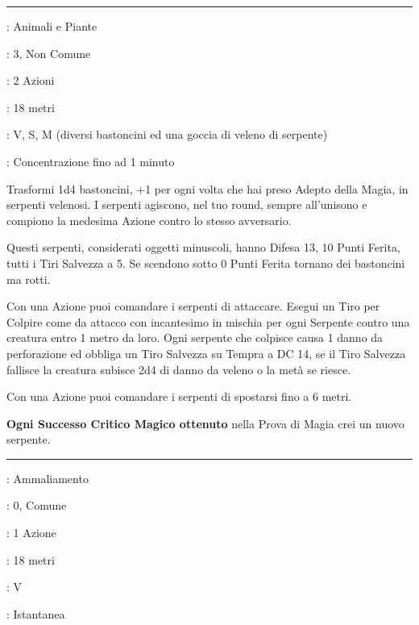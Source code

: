 \begin{multicols}{2}
\smallskip\noindent\rule{\linewidth}{2pt} \hypertarget{Bastoni in Serpenti}{}\medskip{}
\noindent
\begin{description}[noitemsep, topsep=0pt, parsep=0pt, partopsep=0pt, leftmargin=0cm, labelwidth=2.8cm]
	\item[\textbf{Lista di Magia}]: Animali e Piante
	\item[\textbf{Livello}]: 3, Non Comune
	\item[\textbf{T. di Lancio}]: 2 Azioni
	\item[\textbf{Gittata}]: 18 metri
	\item[\textbf{Componenti}]: V, S, M (diversi bastoncini ed una goccia di veleno di serpente)
	\item[\textbf{Durata}]: Concentrazione fino ad 1 minuto
\end{description}

Trasformi 1d4 bastoncini, +1 per ogni volta che hai preso Adepto della Magia, in serpenti velenosi. I serpenti agiscono, nel tuo round, sempre all'unisono e compiono la medesima Azione contro lo stesso avversario.

Questi serpenti, considerati oggetti minuscoli, hanno Difesa 13, 10 Punti Ferita, tutti i Tiri Salvezza a 5. Se scendono sotto 0 Punti Ferita tornano dei bastoncini ma rotti.

Con una Azione puoi comandare i serpenti di attaccare. Esegui un Tiro per Colpire come da attacco con incantesimo in mischia per ogni Serpente contro una creatura entro 1 metro da loro. Ogni serpente che colpisce causa 1 danno da perforazione ed obbliga un Tiro Salvezza su Tempra a DC 14, se il Tiro Salvezza fallisce la creatura subisce 2d4 di danno da veleno o la metà se riesce.

Con una Azione puoi comandare i serpenti di spostarsi fino a 6 metri.

\textbf{Ogni Successo Critico Magico ottenuto} nella Prova di Magia crei un nuovo serpente.

\smallskip\noindent\rule{\linewidth}{2pt} \hypertarget{Beffa Crudele}{}\medskip{}
\noindent
\begin{description}[noitemsep, topsep=0pt, parsep=0pt, partopsep=0pt, leftmargin=0cm, labelwidth=2.8cm]
	\item[\textbf{Lista di Magia}]: Ammaliamento
	\item[\textbf{Livello}]: 0, Comune
	\item[\textbf{T. di Lancio}]: 1 Azione
	\item[\textbf{Gittata}]: 18 metri
	\item[\textbf{Componenti}]: V
	\item[\textbf{Durata}]: Istantanea
\end{description}


\end{multicols}
